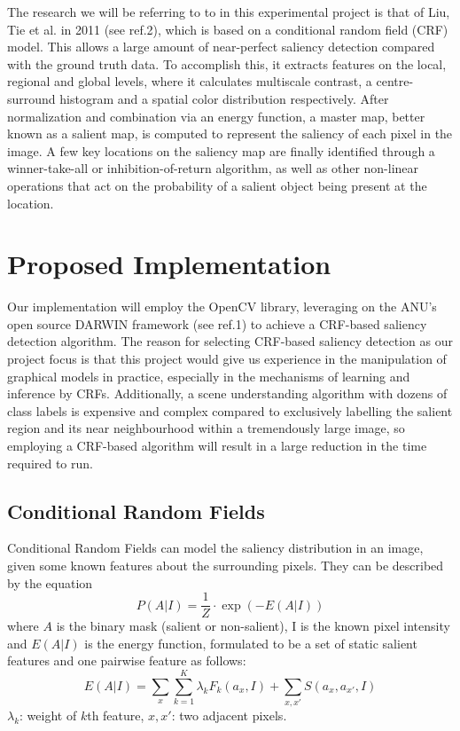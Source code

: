 \documentclass[12pt,a4paper]{article}
\newcommand{\htab}{\hspace*{0.63cm}}
\newenvironment{Figure}
  {\par\medskip\noindent\minipage{\linewidth}}
  {\endminipage\par\medskip}
\begin{document}
\begin{multicols}{2}
\begin{Figure}
\end{Figure}
The research we will be referring to to in this experimental project is that of Liu, Tie et al. in 2011 (see ref.2), which is based on a conditional random field (CRF) model.  This allows a large amount of near-perfect saliency detection compared with the ground truth data. To accomplish this, it extracts features on the local, regional and global levels, where it calculates multiscale contrast, a centre-surround histogram and a spatial color distribution respectively. After normalization and combination via an energy function, a master map, better known as a salient map, is computed to represent the saliency of each pixel in the image. A few key locations on the saliency map are finally identified through a winner-take-all or inhibition-of-return algorithm, as well as  other non-linear operations that act on the probability of a salient object being present at the location.
\section{Proposed Implementation}
\htab Our implementation will employ the  OpenCV library, leveraging on the ANU's open source DARWIN framework (see ref.1) to achieve a CRF-based saliency detection algorithm. The reason for selecting CRF-based saliency detection as our project focus is that this project would give us experience in the manipulation of graphical models in practice, especially in the mechanisms of learning and inference by CRFs. Additionally, a scene understanding algorithm with dozens of class labels is expensive and complex compared to exclusively labelling the salient region and its near neighbourhood within a tremendously large image, so employing a CRF-based algorithm will result in a large reduction in the time required to run.
\subsection{Conditional Random Fields}
\htab Conditional Random Fields can model the saliency distribution in an image, given some known features about the surrounding pixels.  They can be described by the equation
    $$ P(A|I) = \frac{1}{Z} \cdot\exp(-E(A|I)) $$
where $A$ is the binary mask (salient or non-salient), I is the known pixel intensity and $E(A|I)$ is the energy function, formulated to be a set of static salient features and one pairwise feature as follows:
    $$ E(A|I) = \sum_{x} \sum_{k=1}^{K} \lambda_{k} F_{k}(a_{x},I)  
        + \sum_{x,x'} S(a_{x},a_{x'},I)  $$
$\lambda_{k}$: weight of $k$th feature, $x,x'$: two adjacent pixels. 
%

\end{multicols}
\end{document}
